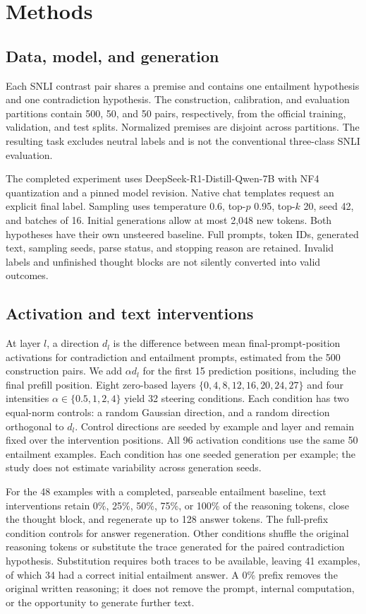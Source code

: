 \documentclass[10pt]{article}
\begin{document}
\section{Methods}
\subsection{Data, model, and generation}
Each SNLI contrast pair shares a premise and contains one entailment hypothesis
and one contradiction hypothesis. The construction, calibration, and evaluation
partitions contain 500, 50, and 50 pairs, respectively, from the official training,
validation, and test splits. Normalized premises are disjoint across partitions.
The resulting task excludes neutral labels and is not the conventional
three-class SNLI evaluation.

The completed experiment uses DeepSeek-R1-Distill-Qwen-7B with NF4 quantization
and a pinned model revision. Native chat templates request an explicit final
label. Sampling uses temperature 0.6, top-$p$ 0.95, top-$k$ 20, seed 42, and
batches of 16. Initial generations allow at most 2,048 new tokens. Both hypotheses
have their own unsteered baseline. Full prompts, token IDs, generated text,
sampling seeds, parse status, and stopping reason are retained. Invalid labels
and unfinished thought blocks are not silently converted into valid outcomes.

\subsection{Activation and text interventions}
At layer $l$, a direction $d_l$ is the difference between mean final-prompt-position
activations for contradiction and entailment prompts, estimated from the 500
construction pairs. We add $\alpha d_l$ for the first 15 prediction positions,
including the final prefill position. Eight zero-based layers
$\{0,4,8,12,16,20,24,27\}$ and four intensities
$\alpha\in\{0.5,1,2,4\}$ yield 32 steering conditions. Each condition has two
equal-norm controls: a random Gaussian direction, and a random direction
orthogonal to $d_l$. Control directions are seeded by example and layer and remain
fixed over the intervention positions. All 96 activation conditions use the same
50 entailment examples. Each condition has one seeded generation per example;
the study does not estimate variability across generation seeds.

For the 48 examples with a completed, parseable entailment baseline, text
interventions retain 0\%, 25\%, 50\%, 75\%, or 100\% of the reasoning tokens,
close the thought block, and regenerate up to 128 answer tokens. The full-prefix
condition controls for answer regeneration. Other conditions shuffle the original
reasoning tokens or substitute the trace generated for the paired contradiction
hypothesis. Substitution requires both traces to be available, leaving 41
examples, of which 34 had a correct initial entailment answer. A 0\% prefix
removes the original written reasoning; it does not remove the prompt, internal
computation, or the opportunity to generate further text.
\end{document}
